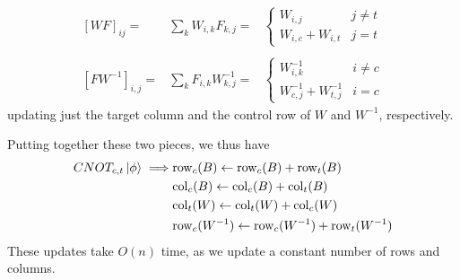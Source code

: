 \[
\begin{array}{rcl}
\left[WF\right]_{ij} = &  \sum_{k}W_{i,k}F_{k,j} = & \begin{cases} W_{i,j} & j\neq t \\ W_{i,c}+W_{i,t} & j=t \end{cases}\\
\\
\left[FW^{-1}\right]_{i,j} = &  \sum_{k}F_{i,k}W_{k,j}^{-1} = & \begin{cases} W^{-1}_{i,k} & i\neq c \\ W^{-1}_{c,j}+W^{-1}_{t,j} & i=c \end{cases}
\end{array}\]
updating just the target column and the control row of $W$ and $W^{-1}$, respectively.\par
Putting together these two pieces, we thus have
\begin{align}
CNOT_{c,t}\ket{\phi} \implies & \mathrm{row}_{c}(B) \gets \mathrm{row}_{c}(B)+\mathrm{row}_{t}(B) \nonumber \\
& \mathrm{col}_{c}(B) \gets \mathrm{col}_{c}(B)+\mathrm{col}_{t}(B) \nonumber \\
& \mathrm{col}_{t}(W) \gets \mathrm{col}_{t}(W) + \mathrm{col}_{c}(W) \nonumber \\
& \mathrm{row}_{c}(W^{-1}) \gets \mathrm{row}_{c}(W^{-1}) + \mathrm{row}_{t}(W^{-1})
\end{align}
These updates take $O(n)$ time, as we update a constant number of rows and columns.\par
